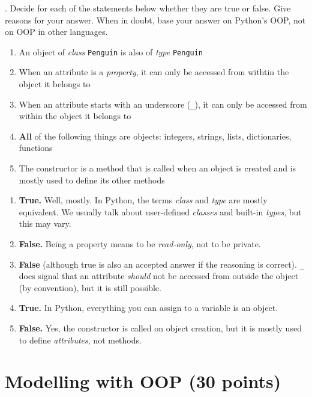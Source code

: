 
. Decide for each of the statements below whether they are true or false. Give reasons for your answer. When in doubt, base your answer on Python's OOP, not on OOP in other languages.

\begin{enumerate}
    \item An object of {\it class} {\tt Penguin} is also of {\it type} {\tt Penguin}
    \item When an attribute is a {\it property}, it can only be accessed from withtin the object it belongs to
    \item When an attribute starts with an underscore ({\tt \_}), it can only be accessed from within the object it belongs to
    \item {\bf All} of the following things are objects: integers, strings, lists, dictionaries, functions
    \item The constructor is a method that is called when an object is created and is mostly used to define its other methods
\end{enumerate}

\begin{solution}
    \begin{enumerate}
        \item {\bf True.} Well, mostly. In Python, the terms {\it class} and {\it type} are mostly equivalent. We usually talk about user-defined {\it classes} and built-in {\it types}, but this may vary.
        \item {\bf False.} Being a property means to be {\it read-only}, not to be private.
        \item {\bf False} (although true is also an accepted answer if the reasoning is correct). {\tt \_} does signal that an attribute {\it should} not be accessed from outside the object (by convention), but it is still possible.
        \item {\bf True.} In Python, everything you can assign to a variable is an object.
        \item {\bf False.} Yes, the constructor is called on object creation, but it is mostly used to define {\it attributes}, not methods.
    \end{enumerate}
\end{solution}





\section{Modelling with OOP (30 points)}


